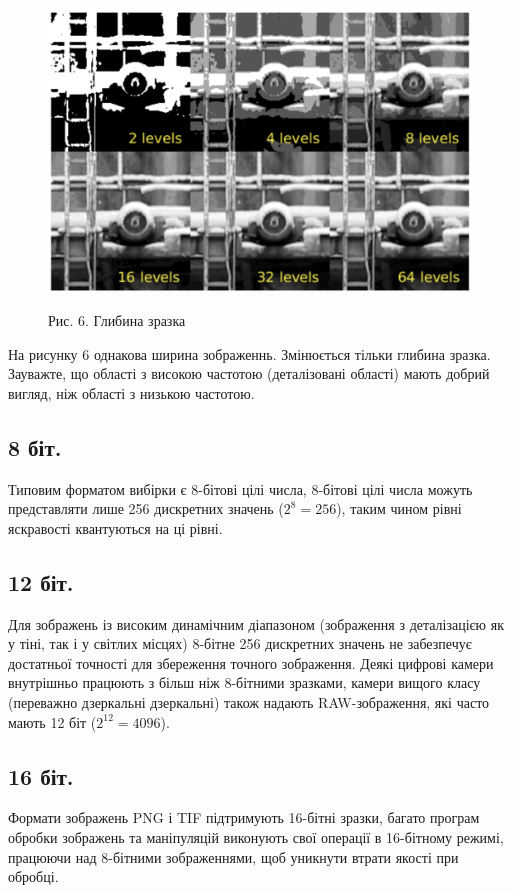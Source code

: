 \documentclass[11pt]{article}
\begin{document}
    \begin{figure}
        \label{fig:image6}
        \centering
        \includegraphics[scale=0.5]{image6.png}

        Рис. 6. Глибина зразка
    \end{figure}

    На рисунку 6 однакова ширина зображеннь.
    Змінюється тільки глибина зразка.
    Зауважте, що області з високою частотою (деталізовані області) мають добрий вигляд, ніж області з низькою частотою.

    \subsection{8 біт.}\label{subsec:bit_eight}
    Типовим форматом вибірки є 8-бітові цілі числа, 8-бітові цілі числа можуть представляти лише 256 дискретних значень (\(2^{8} = 256\)), таким чином рівні яскравості квантуються на ці рівні.

    \subsection{12 біт.}\label{subsec:bit_twelve}
    Для зображень із високим динамічним діапазоном (зображення з деталізацією як у тіні, так і у світлих місцях) 8-бітне 256 дискретних значень не забезпечує достатньої точності для збереження точного зображення.
    Деякі цифрові камери внутрішньо працюють з більш ніж 8-бітними зразками, камери вищого класу (переважно дзеркальні дзеркальні) також надають RAW-зображення, які часто мають 12 біт (\(2^{12} = 4096\)).

    \subsection{16 біт.}\label{subsec:bit_sixteen}
    Формати зображень PNG і TIF підтримують 16-бітні зразки, багато програм обробки зображень та маніпуляцій виконують свої операції в 16-бітному режимі, працюючи над 8-бітними зображеннями, щоб уникнути втрати якості при обробці.
\end{document}
